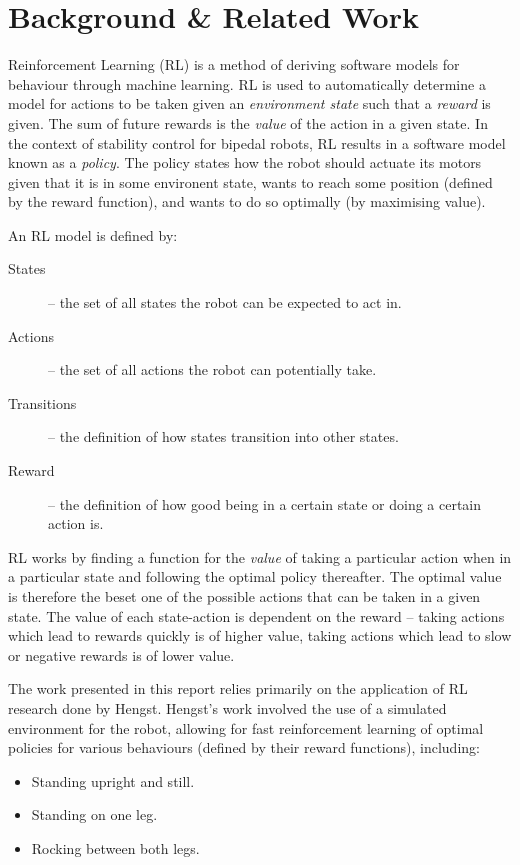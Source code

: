 \newpage
\section{Background \& Related Work}

Reinforcement Learning (RL) is a method of deriving software models for behaviour through machine learning. RL is used to automatically determine a model for actions to be taken given an \textit{environment state} such that a \textit{reward} is given. The sum of future rewards is the \textit{value} of the action in a given state. In the context of stability control for bipedal robots, RL results in a software model known as a \textit{policy}. The policy states how the robot should actuate its motors given that it is in some environent state, wants to reach some position (defined by the reward function), and wants to do so optimally (by maximising value).

An RL model is defined by:\cite{bernhard_rl}

\begin{description}
\item[States] -- the set of all states the robot can be expected to act in.
\item[Actions] -- the set of all actions the robot can potentially take.
\item[Transitions] -- the definition of how states transition into other states.
\item[Reward] -- the definition of how good being in a certain state or doing a certain action is.
\end{description}

RL works by finding a function for the \textit{value} of taking a particular action when in a particular state and following the optimal policy thereafter. The optimal value is therefore the beset one of the possible actions that can be taken in a given state. The value of each state-action is dependent on the reward -- taking actions which lead to rewards quickly is of higher value, taking actions which lead to slow or negative rewards is of lower value.

The work presented in this report relies primarily on the application of RL research done by Hengst\cite{bernhard_rl}. Hengst's work involved the use of a simulated environment for the robot, allowing for fast reinforcement learning of optimal policies for various behaviours (defined by their reward functions), including:

\begin{itemize}
\item Standing upright and still.
\item Standing on one leg.
\item Rocking between both legs.
\end{itemize}

